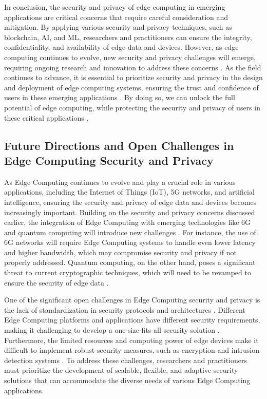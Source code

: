 \documentclass[11pt,a4paper]{article}
\begin{document}
In conclusion, the security and privacy of edge computing in emerging applications are critical concerns that require careful consideration and mitigation. By applying various security and privacy techniques, such as blockchain, AI, and ML, researchers and practitioners can ensure the integrity, confidentiality, and availability of edge data and devices. However, as edge computing continues to evolve, new security and privacy challenges will emerge, requiring ongoing research and innovation to address these concerns \cite{arxiv:2309.05416}. As the field continues to advance, it is essential to prioritize security and privacy in the design and deployment of edge computing systems, ensuring the trust and confidence of users in these emerging applications \cite{arxiv:2303.14329}. By doing so, we can unlock the full potential of edge computing, while protecting the security and privacy of users in these critical applications \cite{arxiv:2301.07803}.


\subsection{Future Directions and Open Challenges in Edge Computing Security and Privacy}


As Edge Computing continues to evolve and play a crucial role in various applications, including the Internet of Things (IoT), 5G networks, and artificial intelligence, ensuring the security and privacy of edge data and devices becomes increasingly important. Building on the security and privacy concerns discussed earlier, the integration of Edge Computing with emerging technologies like 6G and quantum computing will introduce new challenges \cite{arxiv:2004.14850}. For instance, the use of 6G networks will require Edge Computing systems to handle even lower latency and higher bandwidth, which may compromise security and privacy if not properly addressed. Quantum computing, on the other hand, poses a significant threat to current cryptographic techniques, which will need to be revamped to ensure the security of edge data \cite{arxiv:2108.07879}.

One of the significant open challenges in Edge Computing security and privacy is the lack of standardization in security protocols and architectures \cite{arxiv:1701.01090}. Different Edge Computing platforms and applications have different security requirements, making it challenging to develop a one-size-fits-all security solution \cite{arxiv:1701.01090}. Furthermore, the limited resources and computing power of edge devices make it difficult to implement robust security measures, such as encryption and intrusion detection systems \cite{arxiv:2111.10076}. To address these challenges, researchers and practitioners must prioritize the development of scalable, flexible, and adaptive security solutions that can accommodate the diverse needs of various Edge Computing applications.
\end{document}
